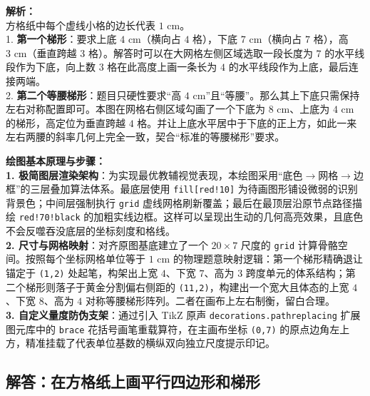 \vspace{0.8cm}

{\small\color{gray}
\textbf{解析：}\\
方格纸中每个虚线小格的边长代表 $1\text{ cm}$。\\
1. \textbf{第一个梯形}：要求上底 $4\text{ cm}$（横向占 $4$ 格），下底 $7\text{ cm}$（横向占 $7$ 格），高 $3\text{ cm}$（垂直跨越 $3$ 格）。解答时可以在大网格左侧区域选取一段长度为 $7$ 的水平线段作为下底，向上数 $3$ 格在此高度上画一条长为 $4$ 的水平线段作为上底，最后连接两端。\\
2. \textbf{第二个等腰梯形}：题目只硬性要求“高 $4\text{ cm}$”且“等腰”。那么其上下底只需保持左右对称配置即可。本图在网格右侧区域勾画了一个下底为 $8\text{ cm}$、上底为 $4\text{ cm}$ 的梯形，高定位为垂直跨越 $4$ 格。并让上底水平居中于下底的正上方，如此一来左右两腰的斜率几何上完全一致，契合“标准的等腰梯形”要求。
}

\vspace{0.6cm}

{\small\color{blue!70!black}
\textbf{绘图基本原理与步骤：}\\
\textbf{1. 极简图层渲染架构}：为实现最优教辅视觉表现，本绘图采用“底色$\to$网格$\to$边框”的三层叠加算法体系。最底层使用 \texttt{fill[red!10]} 为待画图形铺设微弱的识别背景色；中间层强制执行 \texttt{grid} 虚线网格刷新覆盖；最后在最顶层沿原节点路径描绘 \texttt{red!70!black} 的加粗实线边框。这样可以呈现出生动的几何高亮效果，且底色不会反噬吞没底层的坐标刻度和格线。\\
\textbf{2. 尺寸与网格映射}：对齐原图基底建立了一个 $20 \times 7$ 尺度的 \texttt{grid} 计算骨骼空间。按照每个坐标网格单位等于 $1\text{ cm}$ 的物理题意映射逻辑：第一个梯形精确退让锚定于 \texttt{(1,2)} 处起笔，构架出上宽 $4$、下宽 $7$、高为 $3$ 跨度单元的体系结构；第二个梯形则落子于黄金分割偏右侧距的 \texttt{(11,2)}，构建出一个宽大且体态的上宽 $4$、下宽 $8$、高为 $4$ 对称等腰梯形阵列。二者在画布上左右制衡，留白合理。\\
\textbf{3. 自定义量度防伪支架}：通过引入 TikZ 原声 \texttt{decorations.pathreplacing} 扩展图元库中的 \texttt{brace} 花括号画笔重载算符，在主画布坐标 \texttt{(0,7)} 的原点边角左上方，精准挂载了代表单位基数的横纵双向独立尺度提示印记。
}


\newpage

\newpage

\subsection{解答：在方格纸上画平行四边形和梯形}

